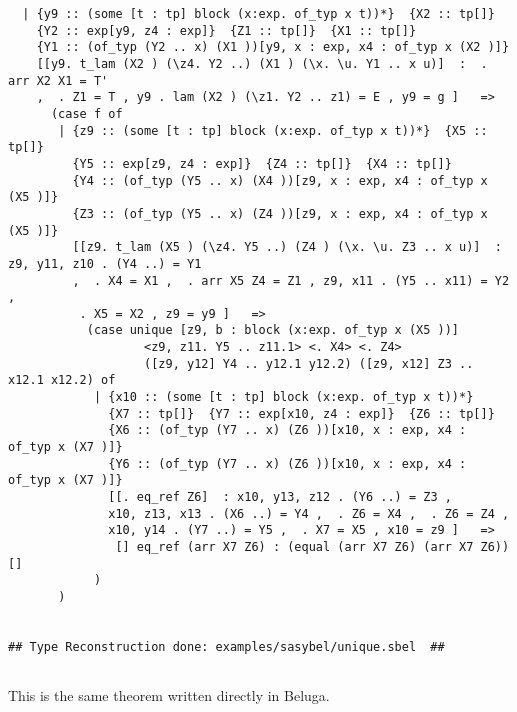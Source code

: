 \documentclass[12pt]{article}
\begin{document}
\begin{verbatim}
  | {y9 :: (some [t : tp] block (x:exp. of_typ x t))*}  {X2 :: tp[]} 
    {Y2 :: exp[y9, z4 : exp]}  {Z1 :: tp[]}  {X1 :: tp[]} 
    {Y1 :: (of_typ (Y2 .. x) (X1 ))[y9, x : exp, x4 : of_typ x (X2 )]}
    [[y9. t_lam (X2 ) (\z4. Y2 ..) (X1 ) (\x. \u. Y1 .. x u)]  :  . arr X2 X1 = T'
    ,  . Z1 = T , y9 . lam (X2 ) (\z1. Y2 .. z1) = E , y9 = g ]   => 
      (case f of 
       | {z9 :: (some [t : tp] block (x:exp. of_typ x t))*}  {X5 :: tp[]} 
         {Y5 :: exp[z9, z4 : exp]}  {Z4 :: tp[]}  {X4 :: tp[]} 
         {Y4 :: (of_typ (Y5 .. x) (X4 ))[z9, x : exp, x4 : of_typ x (X5 )]} 
         {Z3 :: (of_typ (Y5 .. x) (Z4 ))[z9, x : exp, x4 : of_typ x (X5 )]}
         [[z9. t_lam (X5 ) (\z4. Y5 ..) (Z4 ) (\x. \u. Z3 .. x u)]  : z9, y11, z10 . (Y4 ..) = Y1
         ,  . X4 = X1 ,  . arr X5 Z4 = Z1 , z9, x11 . (Y5 .. x11) = Y2 ,
          . X5 = X2 , z9 = y9 ]   => 
           (case unique [z9, b : block (x:exp. of_typ x (X5 ))]
                   <z9, z11. Y5 .. z11.1> <. X4> <. Z4>
                   ([z9, y12] Y4 .. y12.1 y12.2) ([z9, x12] Z3 .. x12.1 x12.2) of 
            | {x10 :: (some [t : tp] block (x:exp. of_typ x t))*} 
              {X7 :: tp[]}  {Y7 :: exp[x10, z4 : exp]}  {Z6 :: tp[]} 
              {X6 :: (of_typ (Y7 .. x) (Z6 ))[x10, x : exp, x4 : of_typ x (X7 )]} 
              {Y6 :: (of_typ (Y7 .. x) (Z6 ))[x10, x : exp, x4 : of_typ x (X7 )]}
              [[. eq_ref Z6]  : x10, y13, z12 . (Y6 ..) = Z3 ,
              x10, z13, x13 . (X6 ..) = Y4 ,  . Z6 = X4 ,  . Z6 = Z4 ,
              x10, y14 . (Y7 ..) = Y5 ,  . X7 = X5 , x10 = z9 ]   => 
               [] eq_ref (arr X7 Z6) : (equal (arr X7 Z6) (arr X7 Z6))[]
            )
       )
  

## Type Reconstruction done: examples/sasybel/unique.sbel  ##


\end{verbatim}
This is the same theorem written directly in \textmd{Beluga}.
\end{document}

